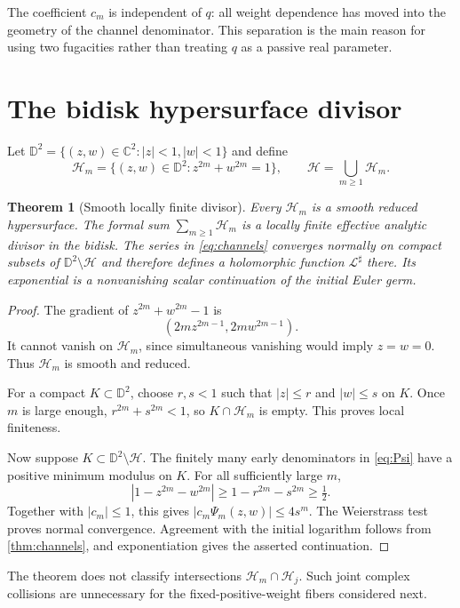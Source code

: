 \documentclass[11pt]{article}
\newtheorem{theorem}{Theorem}[section]
\newcommand{\Dtwo}{\mathbb D^2}
\newcommand{\Hm}{\mathcal H_m}
\newcommand{\Ps}{\Psi}
\begin{document}
The coefficient $c_m$ is independent of $q$: all weight dependence has
moved into the geometry of the channel denominator.  This separation is the
main reason for using two fugacities rather than treating $q$ as a passive
real parameter.

\section{The bidisk hypersurface divisor}

Let $\Dtwo=\{(z,w)\in\mathbb C^2:|z|<1,|w|<1\}$ and define
\begin{equation}\label{eq:Hm}
 \Hm=\{(z,w)\in\Dtwo:z^{2m}+w^{2m}=1\},\qquad
 \mathcal H=\bigcup_{m\ge1}\Hm.
\end{equation}

\begin{theorem}[Smooth locally finite divisor]\label{thm:divisor}
Every $\Hm$ is a smooth reduced hypersurface.  The formal sum
$\sum_{m\ge1}\Hm$ is a locally finite effective analytic divisor in the
bidisk.  The series in \eqref{eq:channels} converges normally on compact
subsets of $\Dtwo\setminus\mathcal H$ and therefore defines a holomorphic
function $\mathcal L^{\sharp}$ there.  Its exponential is a nonvanishing
scalar continuation of the initial Euler germ.
\end{theorem}

\begin{proof}
The gradient of $z^{2m}+w^{2m}-1$ is
\[
 (2mz^{2m-1},2mw^{2m-1}).
\]
It cannot vanish on $\Hm$, since simultaneous vanishing would imply
$z=w=0$.  Thus $\Hm$ is smooth and reduced.

For a compact $K\subset\Dtwo$, choose $r,s<1$ such that $|z|\le r$ and
$|w|\le s$ on $K$.  Once $m$ is large enough,
$r^{2m}+s^{2m}<1$, so $K\cap\Hm$ is empty.  This proves local finiteness.

Now suppose $K\subset\Dtwo\setminus\mathcal H$.  The finitely many early
denominators in \eqref{eq:Psi} have a positive minimum modulus on $K$.
For all sufficiently large $m$,
\[
 |1-z^{2m}-w^{2m}|\ge1-r^{2m}-s^{2m}\ge\tfrac12.
\]
Together with $|c_m|\le1$, this gives
$|c_m\Ps_m(z,w)|\le4s^m$.  The Weierstrass test proves normal convergence.
Agreement with the initial logarithm follows from \cref{thm:channels}, and
exponentiation gives the asserted continuation.
\end{proof}

The theorem does not classify intersections $\Hm\cap\mathcal H_j$.  Such
joint complex collisions are unnecessary for the fixed-positive-weight
fibers considered next.
\end{document}
